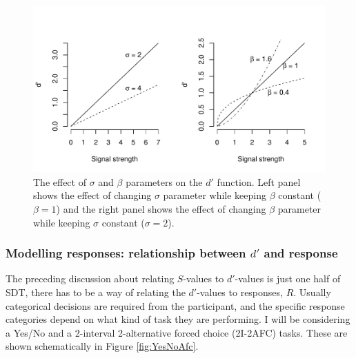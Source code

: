 \documentclass{article}\usepackage{knitr}
\begin{document}
\begin{figure}[!htb]
\begin{center}
\begin{knitrout}
\color{fgcolor}
\includegraphics[width=\maxwidth]{figure/unnamed-chunk-3-1} 

\end{knitrout}
\end{center}
\caption{ The effect of $\sigma$ and $\beta$ parameters on the $d'$ function. Left panel shows the effect of changing $\sigma$ parameter while keeping $\beta$ constant ($\beta = 1$) and the right panel shows the effect of changing $\beta$ parameter while keeping $\sigma$ constant ($\sigma = 2$).}
\label{fig:dprimefunc}
\end{figure}

\subsubsection{Modelling responses: relationship between $d'$ and response}

The preceding discussion about relating $S$-values to $d'$-values is just one half of SDT, there has to be a way of relating the $d'$-values to responses, $R$. Usually categorical decisions are required from the participant, and the specific response categories depend on what kind of task they are performing. I will be considering a Yes/No and a 2-interval 2-alternative forced choice (2I-2AFC) tasks. These are shown schematically in Figure \ref{fig:YesNoAfc}.
\end{document}
